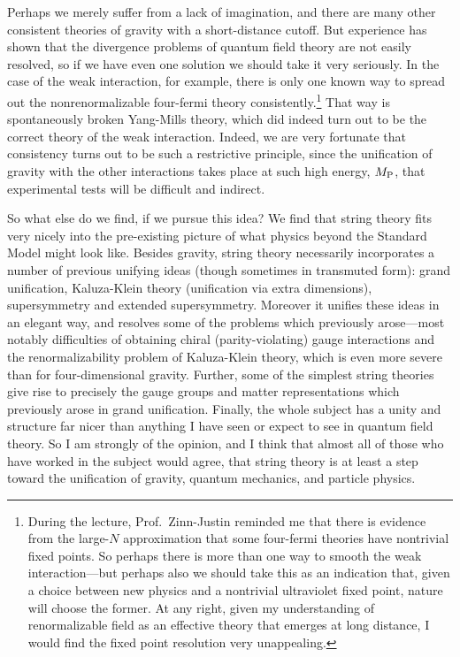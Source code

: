 Perhaps we merely suffer from a lack of imagination, and there are
many other consistent theories of gravity with a short-distance
cutoff.  But experience has shown that the divergence problems of
quantum field theory are not easily resolved, so if we have even one
solution we should take it very seriously.  In the case of the weak
interaction, for example, there is only one known way to spread out
the nonrenormalizable four-fermi theory consistently.\footnote
{During the lecture, Prof.~Zinn-Justin reminded me that there is
evidence from the large-$N$ approximation that some four-fermi
theories have nontrivial fixed points.  So perhaps there is more
than one way to smooth the weak interaction---but perhaps also we
should take this as an indication that, given a choice between new
physics and a nontrivial ultraviolet fixed point, nature will choose
the former.  At any right, given my understanding of renormalizable field
as an effective theory that emerges at long distance, I would find the
fixed point resolution very unappealing.}
That way is
spontaneously broken Yang-Mills theory, which did indeed turn out to
be the correct theory of the weak interaction. Indeed, we are very
fortunate that consistency turns out to be such a restrictive
principle, since the unification of gravity with the other
interactions takes place at such high energy, $M_{\rm P}$, that
experimental tests will be difficult and indirect.

So what else do we find, if we pursue this idea?  We find that
string theory fits very nicely into the pre-existing picture of
what physics beyond the Standard Model might look like.  Besides
gravity, string theory necessarily incorporates a number of
previous unifying ideas (though sometimes in transmuted form):
grand unification, Kaluza-Klein theory (unification via extra
dimensions), supersymmetry and extended supersymmetry.  Moreover it
unifies these ideas in an elegant way, and resolves some of the
problems which previously arose---most notably difficulties of
obtaining chiral (parity-violating) gauge interactions and the
renormalizability problem of Kaluza-Klein theory, which is even more
severe than for four-dimensional gravity.
Further, some of the simplest string theories~\cite{CHSW}
give rise to
precisely the gauge groups and matter representations which previously
arose in grand unification.  Finally, the whole subject has a unity and
structure far nicer than anything I have seen or expect to see in
quantum field theory.  So I am strongly of the opinion, and I think
that almost all of those who have worked in the subject would agree,
that string theory is at least a step toward the unification of
gravity, quantum mechanics, and particle physics.

